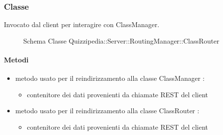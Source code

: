 \subsubsection{Classe }
Invocato dal client per interagire con ClassManager.
\begin{figure}[H]
\centering
\noindent{}
\caption[Schema Classe ClassRouter]{Schema Classe Quizzipedia::Server::RoutingManager::ClassRouter}
\end{figure}
\paragraph{Metodi}
\begin{itemize}
\item {}
\newline
metodo usato per il reindirizzamento alla classe ClassManager
\newline
{} :
\begin{itemize}
\item {}
\newline
contenitore dei dati provenienti da chiamate REST del client
\end{itemize}
\item {}
\newline
metodo usato per il reindirizzamento alla classe ClassRouter
\newline
{} :
\begin{itemize}
\item {}
\newline
contenitore dei dati provenienti da chiamate REST del client
\end{itemize}
\end{itemize}
